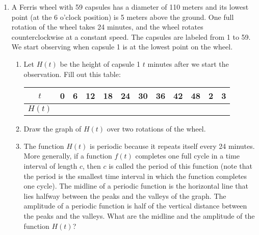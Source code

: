 \documentclass[12pt,dvipsnames]{article}
\begin{document}
\begin{enumerate}[label= {\bf  \arabic*:}]
	\item A Ferris wheel with 59 capsules has a diameter of 110 meters and its lowest point (at the 6 o'clock position) is 5 meters above the ground. One full rotation of the wheel takes 24 minutes, and the wheel rotates counterclockwise at a constant speed. The capsules are labeled from 1 to 59. We start observing when capsule 1 is at the lowest point on the wheel. 
	\begin{enumerate}
		\item Let $H(t)$ be the height of capsule 1 $t$ minutes after we start the observation. Fill out this table:
		
		\begin{minipage}{\linewidth}
			\centering
			\begin{tabularx}{0.8\textwidth}{|X|X|X|X|X|X|X|X|X|X|X|X|X|}
				\hline
				\multicolumn{2}{|c|}{$t$}         &0&6& 12 & 18 & 24 & 30 & 36 & 42 &48&2&3\\ \hline
				\multicolumn{2}{|c|}{$H(t)$}   & & &     &     &     &     &     && & &     \\ \hline
			\end{tabularx}
		\end{minipage}
		
		\item Draw the graph of $H(t)$ over two rotations of the wheel.
		\item The function $H(t)$ is periodic because it repeats itself every 24 minutes. More generally, if a function $f(t)$ completes one full cycle in a time interval of length $c$, then $c$ is called the period of this function (note that the period is the smallest time interval in which the function completes one cycle). The midline of a periodic function is the horizontal line that lies halfway between the peaks and the valleys of the graph. The amplitude of a periodic function is half of the vertical distance between the peaks and the valleys. What are the midline and the amplitude of the function $H(t)$?
		

\end{enumerate}
\end{enumerate}
\end{document}
